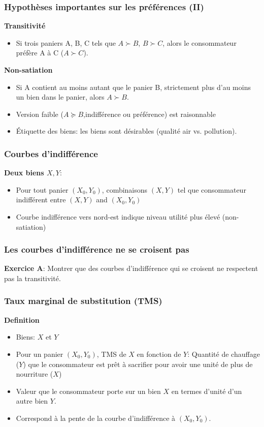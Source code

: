 \documentclass[handout]{beamer}
\begin{document}
\begin{frame}\frametitle{Hypothèses importantes sur les préférences (II)}
\textbf{Transitivité}
\begin{itemize}
\item Si trois paniers A, B, C  tels que  $A\succ B$, $B \succ C$, 
alors le consommateur préfère A à C ($A \succ C$).
\end{itemize}

\textbf{Non-satiation}\begin{itemize}
\item Si A contient au moins autant que le panier B, strictement plus d'au moins un bien dans le panier,
alors $A \succ B$.
\item Version faible ($A \succeq B$,indifférence ou préférence) est raisonnable  
\item Étiquette des biens: les biens sont désirables (qualité air vs. pollution). 
\end{itemize}


\end{frame}

\begin{frame}\frametitle{Courbes d'indifférence}
\textbf{Deux biens $X,Y$}:
\begin{itemize}
\item Pour tout panier $(X_0,Y_0)$, combinaisons $(X,Y)$ tel que consommateur indifférent entre $(X,Y)$ and $(X_0,Y_0)$
\item Courbe indifférence vers nord-est indique niveau utilité plus élevé (non-satiation)
\end{itemize}

\end{frame}

\begin{frame}\frametitle{Les courbes d'indifférence ne se croisent pas}

\textbf{Exercice A}: Montrer que des courbes d'indifférence qui se croisent ne respectent pas la transitivité.
\end{frame}


\begin{frame}\frametitle{Taux marginal de substitution (TMS)}
\textbf{Definition}
\begin{itemize}
\item Biens:  $X$ et $Y$
\item Pour un panier $(X_0, Y_0)$, TMS de $X$ en fonction de $Y$: Quantité de chauffage ($Y$) que le consommateur est prêt à sacrifier pour avoir une unité de plus de nourriture ($X$)
\item Valeur que le consommateur porte sur un bien $X$ en termes d'unité d'un autre bien $Y$.
\item Correspond à la pente de la courbe d'indifférence à $(X_0,Y_0)$.
\end{itemize}
\end{frame}
\end{document}
